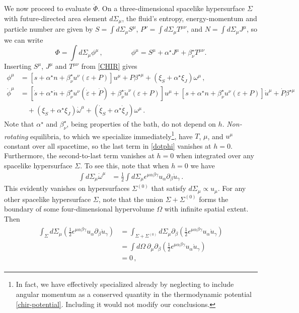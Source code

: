\documentclass[a4paper, amsfonts, amssymb, amsmath, reprint, showkeys, nofootinbib, twoside,notitlepage,onecolumn,preprintnumbers]{revtex4-2}
\theoremstyle{definition}
\theoremstyle{theorem}
\theoremstyle{corollary}
\begin{document}
We now proceed to evaluate $\dot\Phi$. On a three-dimensional spacelike hypersurface $\Sigma$ with future-directed area element $d\Sigma_\mu$, the fluid's entropy, energy-momentum and particle number are given by $S=\int d\Sigma_\mu S^\mu$, $P^\nu = \int d\Sigma_\mu T^{\mu\nu}$, and $N=\int d\Sigma_\mu J^\mu$, so we can write
\begin{equation}
	\Phi = \int d\Sigma_\mu \phi^\mu\, , \qquad\qquad \phi^\mu = S^\mu + \alpha^\star J^\mu + \beta^\star_\nu T^{\mu\nu}.
\end{equation}
Inserting $S^\mu$, $J^\mu$ and $T^{\mu\nu}$ from \eqref{CHIR} gives
\begin{align}
    \phi^\mu &= [s + \alpha^\star n + \beta^\star_\nu u^\nu (\varepsilon + P)] u^\mu + P \beta^{\star\mu} + (\xi_S + \alpha^\star \xi_J)\omega^\mu\, , \\
    \label{dotphi}
    \dot\phi^\mu &= [\dot s + \alpha^\star \dot n + \beta_\nu^\star u^\nu (\dot \varepsilon + \dot P)+ \beta_\nu^\star \dot u^\nu (\varepsilon + P)] u^\mu + [s + \alpha^\star n + \beta^\star_\nu u^\nu (\varepsilon + P)]\dot u^\mu + \dot P \beta^{\star\mu} \\
    &\quad  + (\xi_S + \alpha^\star \xi_J)\dot\omega^\mu + (\dot \xi_S + \alpha^\star \dot \xi_J)\omega^\mu\, . \nonumber
\end{align}
Note that $\alpha^\star$ and $\beta^\star_\nu$, being properties of the bath, do not depend on $h$. \emph{Non-rotating} equilibria, to which we specialize immediately\footnote{In fact, we have effectively specialized already by neglecting to include angular momentum as a conserved quantity in the thermodynamic potential \eqref{chir-potential}. Including it would not modify our conclusions.}, have $T$, $\mu$, and $u^\mu$ constant over all spacetime, so the last term in \eqref{dotphi} vanishes at $h=0$. Furthermore, the second-to-last term vanishes at $h=0$ when integrated over any spacelike hypersurface $\Sigma$. To see this, note that when $h=0$ we have
\begin{align}
	\int d\Sigma_\mu \dot\omega^\mu &= \frac{1}{2}\int d\Sigma_\mu \epsilon^{\mu\alpha\beta\gamma}u_\alpha \partial_\beta \dot u_\gamma\, .
\end{align}
This evidently vanishes on hypersurfaces $\Sigma^{(0)}$ that satisfy $d\Sigma_\mu \propto u_\mu$. For any other spacelike hypersurface $\Sigma$, note that the union $\Sigma + \Sigma^{(0)}$ forms the boundary of some four-dimensional hypervolume $\Omega$ with infinite spatial extent. Then
\begin{align} \label{gauss}
    \begin{split}
        \int_{\Sigma} d\Sigma_\mu \left( \frac{1}{2} \epsilon^{\mu\alpha\beta\gamma} u_\alpha \partial_\beta \dot u_\gamma \right) &= \int_{\Sigma + \Sigma^{(0)}} d\Sigma_\mu \partial_\beta \left( \frac{1}{2} \epsilon^{\mu\alpha\beta\gamma} u_\alpha \dot u_\gamma \right) \\
	&= \int d\Omega\ \partial_\mu \partial_\beta \left( \frac{1}{2}\epsilon^{\mu\alpha\beta\gamma}u_\alpha \dot u_\gamma \right) \\
	&= 0\, ,
    \end{split}
\end{align}
\end{document}
